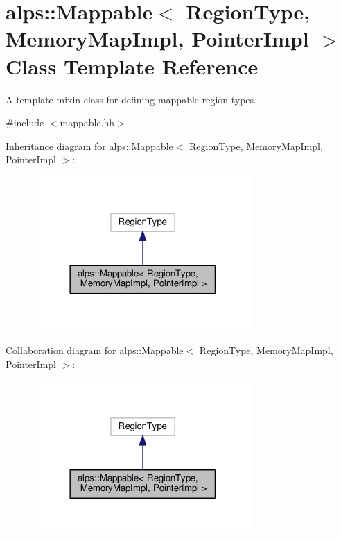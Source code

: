 \hypertarget{classalps_1_1Mappable}{}\section{alps\+:\+:Mappable$<$ Region\+Type, Memory\+Map\+Impl, Pointer\+Impl $>$ Class Template Reference}
\label{classalps_1_1Mappable}


A template mixin class for defining mappable region types.  




{\ttfamily \#include $<$mappable.\+hh$>$}



Inheritance diagram for alps\+:\+:Mappable$<$ Region\+Type, Memory\+Map\+Impl, Pointer\+Impl $>$\+:
\nopagebreak
\begin{figure}[H]
\begin{center}
\leavevmode
\includegraphics[width=237pt]{classalps_1_1Mappable__inherit__graph}
\end{center}
\end{figure}


Collaboration diagram for alps\+:\+:Mappable$<$ Region\+Type, Memory\+Map\+Impl, Pointer\+Impl $>$\+:
\nopagebreak
\begin{figure}[H]
\begin{center}
\leavevmode
\includegraphics[width=237pt]{classalps_1_1Mappable__coll__graph}
\end{center}
\end{figure}
